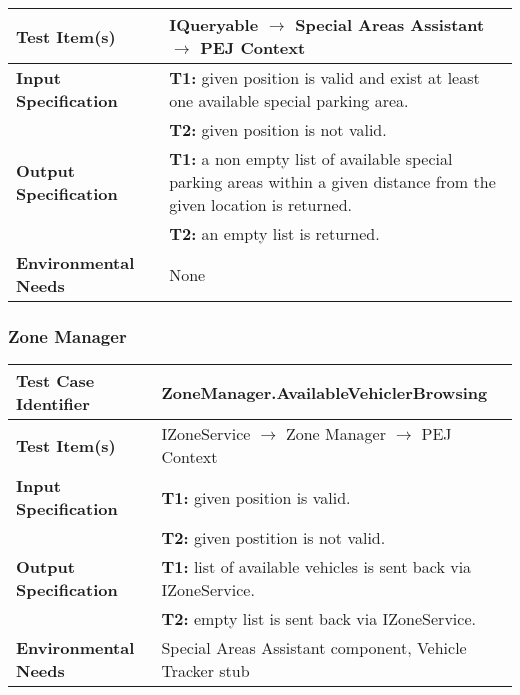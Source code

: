 {\begin{tabularx}{\textwidth}{l X}
    \textbf{Test Item(s)} & IQueryable $\rightarrow$ Special Areas Assistant $\rightarrow$ PEJ Context\\
    \hline 
    
    \textbf{Input Specification} & \textbf{T1:} given position is valid and exist at least one available special parking area.\\
                                & \textbf{T2:} given position is not valid.\\
    \hline 
    
    \textbf{Output Specification} & \textbf{T1:} a non empty list of available special parking areas within a given distance from the given location is returned.\\
                                & \textbf{T2:} an empty list is returned.\\
    \hline 
    
    \textbf{Environmental Needs} & None\\
    \hline
\end{tabularx}

\noindent 
\subsubsection{Zone Manager}
\begin{tabularx}{\textwidth}{l X}
    \hline 
    \textbf{Test Case Identifier} & ZoneManager.AvailableVehiclerBrowsing\\ 
    \hline 
    
    \textbf{Test Item(s)} & IZoneService $\rightarrow$ Zone Manager $\rightarrow$ PEJ Context\\
    \hline 
    
    \textbf{Input Specification} & \textbf{T1:} given position is valid.\\
                                & \textbf{T2:} given postition is not valid.\\
    \hline 
    
    \textbf{Output Specification} & \textbf{T1:} list of available vehicles is sent back via IZoneService.\\
                                 & \textbf{T2:} empty list is sent back via IZoneService.\\
    \hline 
    
    \textbf{Environmental Needs} & Special Areas Assistant component, Vehicle Tracker stub\\
    \hline
\end{tabularx}
\bigskip 

}
